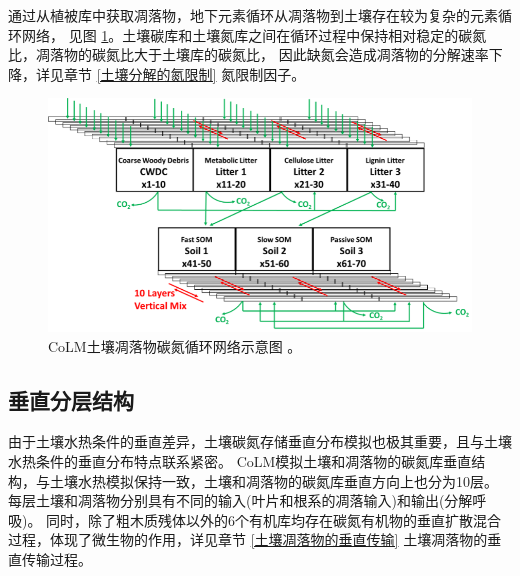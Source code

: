 通过从植被库中获取凋落物，地下元素循环从凋落物到土壤存在较为复杂的元素循环网络，
见图 \ref{fig:CoLM土壤凋落物碳氮循环网络示意图}。土壤碳库和土壤氮库之间在循环过程中保持相对稳定的碳氮比，凋落物的碳氮比大于土壤库的碳氮比，
因此缺氮会造成凋落物的分解速率下降，详见章节 \ref{土壤分解的氮限制} 氮限制因子。
{
\begin{figure}[htbp]
\centering
\includegraphics{Figures/碳氮库结构/CoLM土壤凋落物碳氮循环网络示意图.png}
\caption{CoLM土壤凋落物碳氮循环网络示意图 \citep{huang2018matrix}。  }
\label{fig:CoLM土壤凋落物碳氮循环网络示意图}
\end{figure}
}
\subsection{垂直分层结构}\label{垂直分层结构}
由于土壤水热条件的垂直差异，土壤碳氮存储垂直分布模拟也极其重要，且与土壤水热条件的垂直分布特点联系紧密。
CoLM模拟土壤和凋落物的碳氮库垂直结构，与土壤水热模拟保持一致，土壤和凋落物的碳氮库垂直方向上也分为10层。
每层土壤和凋落物分别具有不同的输入(叶片和根系的凋落输入)和输出(分解呼吸)。
同时，除了粗木质残体以外的6个有机库均存在碳氮有机物的垂直扩散混合过程，体现了微生物的作用，详见章节 \ref{土壤凋落物的垂直传输} 土壤凋落物的垂直传输过程。

